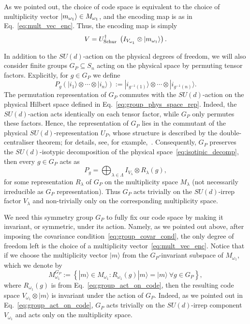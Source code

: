\documentclass[10pt,twocolumn,superscriptaddress,aps,amsmath,amssymb,citeautoscript,floatfix,prx,longbibliography]{revtex4-2}
\theoremstyle{plain}
\theoremstyle{plain}
\theoremstyle{plain}
\theoremstyle{plain}
\theoremstyle{plain}
\theoremstyle{plain}
\begin{document}
As we pointed out, the choice of code space is equivalent to the choice of multiplicity vector $\ket{m_{\omega_1}}\in M_{\omega_1}$, and the encoding map is as in Eq.~\eqref{eq:mult_vec_enc}.
Thus, the encoding map is simply
\begin{equation}\label{eq:schur_transform_enc}
    V=U_{\text {Schur }}^{\dagger}\left(I_{V_{\omega_1}} \otimes\ket{m_{\omega_1}}\right).
\end{equation}

In addition to the \(SU(d)\)-action on the physical degrees of freedom, we will also consider finite groups
\(G_P\subseteq S_n\) acting on the physical space by permuting tensor factors. Explicitly, for
\(g\in G_P\) we define
\begin{equation}\label{eq:group_act_on_phys_space}
    P_g
    \left(
        |i_1\rangle\otimes \cdots \otimes |i_n\rangle
    \right)
    :=
    |i_{g^{-1}(1)}\rangle\otimes \cdots \otimes |i_{g^{-1}(n)}\rangle .
\end{equation}
The permutation representation of \(G_P\) commutes with the \(SU(d)\)-action on the physical Hilbert space defined in Eq.~\eqref{eq:group_phys_space_rep}. Indeed, the \(SU(d)\)-action acts identically on each tensor factor, while \(G_P\) only permutes these factors. Hence, the representation of \(G_P\) lies in the commutant of the physical \(SU(d)\)-representation \(U_P\), whose structure is described by the double-centraliser theorem; for details, see, for example,~\cite{GoodmanWallach2009}. Consequently, \(G_P\) preserves the \(SU(d)\)-isotypic decomposition of the physical space~\eqref{eq:isotipic_decomp}, then every \(g\in G_P\) acts as
\begin{equation}\label{eq:group_act_on_code}
    P_g
    =
    \bigoplus_{\lambda\in\Lambda}
    I_{V_\lambda}\otimes R_\lambda(g),
\end{equation}
for some representation \(R_\lambda\) of \(G_P\) on the multiplicity space \(M_\lambda\) (not necessarily irreducible as $G_P$ representation). Thus \(G_P\) acts trivially on the \(SU(d)\)-irrep factor \(V_\lambda\) and non-trivially only on the corresponding multiplicity space.

We need this symmetry group \(G_P\) to fully fix our code space by making it invariant, or symmetric, under its action. Namely, as we pointed out above, after imposing the covariance condition~\eqref{eq:group_covar_cond}, the only degree of freedom left is the choice of a multiplicity vector~\eqref{eq:mult_vec_enc}. Notice that if we choose the multiplicity vector \(|m\rangle\) from the \(G_P\)-invariant subspace of \(M_{\omega_1}\), which we denote by 
\begin{equation}\label{eq:g_inv_subspace}
    M_{\omega_1}^{G_P}:=
    \left\{
        |m\rangle\in M_{\omega_1}
        :
        R_{\omega_1}(g)|m\rangle=|m\rangle
        \ \forall g\in G_P
    \right\},
\end{equation}
where $R_{\omega_1}(g)$ is from Eq.~\eqref{eq:group_act_on_code}, then the resulting code space
\(
    V_{\omega_1}\otimes |m\rangle
\)
is invariant under the action of \(G_P\). Indeed, as we pointed out in Eq.~\eqref{eq:group_act_on_code}, \(G_P\) acts trivially on the \(SU(d)\)-irrep component \(V_{\omega_1}\) and acts only on the multiplicity space.
\end{document}

